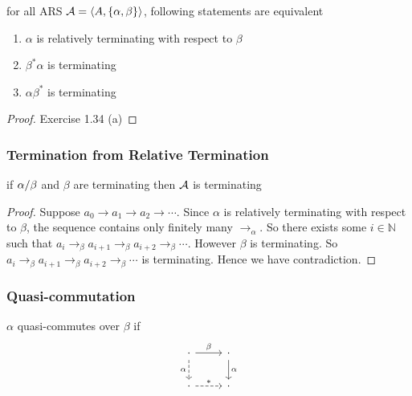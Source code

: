 \documentclass[12pt,aspectratio=169]{beamer}
\begin{document}
\begin{frame}
\begin{lemma}
    for all ARS $\mathcal{A} = \langle A, \{\alpha,\beta\} \rangle$, following statements are equivalent
    \begin{enumerate}
        \item $\alpha$ is relatively terminating with respect to $\beta$
        \item $\beta^*\alpha$ is terminating
        \item $\alpha\beta^*$ is terminating
    \end{enumerate}
\end{lemma}

\begin{proof}
    Exercise 1.34 (a) 
\end{proof}

\end{frame}
\newcommand{\bto}{\to_{\beta}}
\newcommand{\ato}{\to_{\alpha}}

\begin{frame}
    \frametitle{Termination from Relative Termination}
    \begin{lemma}
        if $\alpha/\beta$ and $\beta$ are terminating then $\mathcal{A}$ is terminating
    \end{lemma}
    \begin{proof}
        Suppose $a_0 \to a_1 \to a_2 \to \cdots$. Since $\alpha$ is relatively terminating
        with respect to $\beta$, the sequence contains only finitely many $\ato$.
        So there exists some $i \in \mathbb{N}$ such that
        $a_i \bto a_{i+1} \bto a_{i+2} \bto \cdots$. 
        However $\beta$ is terminating.
        So $a_i \bto a_{i+1} \bto a_{i+2} \bto \cdots$ is terminating.
        Hence we have contradiction.
    \end{proof}
\end{frame}

\begin{frame}[fragile]
    \frametitle{Quasi-commutation}
    \begin{definition}
        $\alpha$ \alert{quasi-commutes} over $\beta$ if
        \[
        \begin{tikzcd}
            \cdot & \cdot \\
            \cdot & \cdot
            \arrow["\beta", from=1-1, to=1-2]
            \arrow["\alpha", from=1-2, to=2-2]
            \arrow["\alpha"', dashed, from=1-1, to=2-1]
            \arrow["{*}", dashed, from=2-1, to=2-2]
        \end{tikzcd}
        \]
    \end{definition}

    \begin{example}
    \end{example}
\end{frame}
\end{document}
